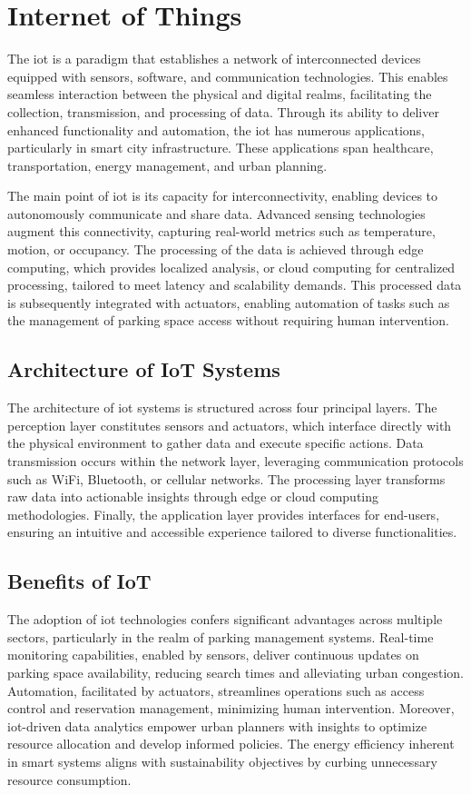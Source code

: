 \chapter{Internet of Things}\label{iot}

The \gls{iot} is a paradigm that establishes a network of interconnected devices equipped with sensors, software, and communication technologies. This enables seamless interaction between the physical and digital realms, facilitating the collection, transmission, and processing of data. Through its ability to deliver enhanced functionality and automation, the \gls{iot} has numerous applications, particularly in smart city infrastructure. These applications span healthcare, transportation, energy management, and urban planning.

The main point of \gls{iot} is its capacity for interconnectivity, enabling devices to autonomously communicate and share data. Advanced sensing technologies augment this connectivity, capturing real-world metrics such as temperature, motion, or occupancy. The processing of the data is achieved through edge computing, which provides localized analysis, or cloud computing for centralized processing, tailored to meet latency and scalability demands. This processed data is subsequently integrated with actuators, enabling automation of tasks such as the management of parking space access without requiring human intervention.

\section{Architecture of IoT Systems}
The architecture of \gls{iot} systems is structured across four principal layers. The perception layer constitutes sensors and actuators, which interface directly with the physical environment to gather data and execute specific actions. Data transmission occurs within the network layer, leveraging communication protocols such as WiFi, Bluetooth, or cellular networks. The processing layer transforms raw data into actionable insights through edge or cloud computing methodologies. Finally, the application layer provides interfaces for end-users, ensuring an intuitive and accessible experience tailored to diverse functionalities.

\section{Benefits of IoT}
The adoption of \gls{iot} technologies confers significant advantages across multiple sectors, particularly in the realm of parking management systems. Real-time monitoring capabilities, enabled by sensors, deliver continuous updates on parking space availability, reducing search times and alleviating urban congestion. Automation, facilitated by actuators, streamlines operations such as access control and reservation management, minimizing human intervention. Moreover, \gls{iot}-driven data analytics empower urban planners with insights to optimize resource allocation and develop informed policies. The energy efficiency inherent in smart systems aligns with sustainability objectives by curbing unnecessary resource consumption.

